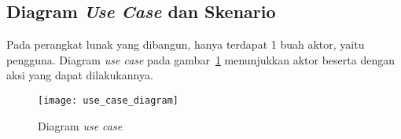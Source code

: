 
\subsection{Diagram \textit{Use Case} dan Skenario}
Pada perangkat lunak yang dibangun, hanya terdapat 1 buah aktor, yaitu pengguna. Diagram \textit{use case} pada gambar~\ref{fig:use_case_diagram} menunjukkan aktor beserta dengan aksi yang dapat dilakukannya.
\begin{figure}[h]
	\centering  
	\texttt{[image: use\_case\_diagram]}
	\caption[Diagram \textit{use case}]{Diagram \textit{use case}}
	\label{fig:use_case_diagram}
\end{figure}

